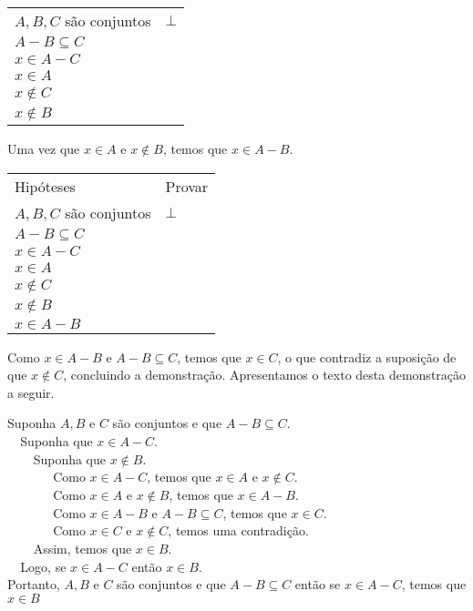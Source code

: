\begin{Example}
\begin{flushleft}
\begin{tabular}{ll}
$A,B,C$ são conjuntos & $\bot$\\
 $A - B \subseteq C$ & \\
$x\in A - C$ & \\
$x\in A$ & \\
$x\not\in C$ & \\
$x\not\in B$ & \\
\end{tabular}
\end{flushleft}
Uma vez que $x\in A$ e $x\not\in B$, temos que $x\in A - B$.
\begin{flushleft}
\begin{tabular}{ll}
Hipóteses & Provar \\
$A,B,C$ são conjuntos & $\bot$\\
 $A - B \subseteq C$ & \\
$x\in A - C$ & \\
$x\in A$ & \\
$x\not\in C$ & \\
$x\not\in B$ & \\
$x\in A - B$ & \\
\end{tabular}
\end{flushleft}
Como $x\in A - B$ e $A - B \subseteq C$, temos que $x\in C$, o que
contradiz a suposição de que $x\not\in C$, concluindo a demonstração.
Apresentamos o texto desta demonstração a seguir.

\begin{flushleft}
Suponha $A,B$ e $C$ são conjuntos e que $A - B \subseteq C$.\\
\verb|  |Suponha que $x\in A - C$.\\
\verb|    |Suponha que $x\not\in B$.\\
\verb|       |Como $x\in A - C$, temos que $x\in A$ e $x\not\in C$.\\
\verb|       |Como $x\in A$ e $x\not\in B$, temos que $x \in A - B$.\\
\verb|       |Como $x\in A - B$ e $A- B \subseteq C$, temos que $x\in
C$.\\
\verb|       |Como $x\in C$ e $x\not\in C$, temos uma contradição.\\
\verb|    |Assim, temos que $x\in B$.\\
\verb|  |Logo, se $x\in A - C$ então $x\in B$.\\
Portanto, $A,B$ e $C$ são conjuntos e que $A - B \subseteq C$ então se
$x \in A - C$, temos que  $x \in B$
\end{flushleft}
\end{Example}

